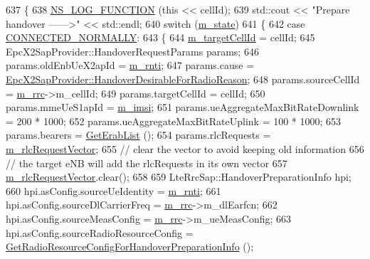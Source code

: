 \begin{DoxyCode}
637 \{
638   \hyperlink{log-macros-disabled_8h_a90b90d5bad1f39cb1b64923ea94c0761}{NS\_LOG\_FUNCTION} (\textcolor{keyword}{this} << cellId);
639   std::cout << \textcolor{stringliteral}{"Prepare handover ------>"} << std::endl;
640   \textcolor{keywordflow}{switch} (\hyperlink{classns3_1_1UeManager_aaed4b2490297cb912e743084f1a27b08}{m\_state})
641     \{
642     \textcolor{keywordflow}{case} \hyperlink{classns3_1_1UeManager_a2f4085fdd18d7125c27da44a5b8b6808a2a1020dce30f19aa9354ba34b2e7c5e0}{CONNECTED\_NORMALLY}:
643       \{
644         \hyperlink{classns3_1_1UeManager_a8a70641b8dfb0641e6cfcf4cc83083a3}{m\_targetCellId} = cellId;
645         EpcX2SapProvider::HandoverRequestParams params;
646         params.oldEnbUeX2apId = \hyperlink{classns3_1_1UeManager_a5a72b4fe818f21993bd7f05d7e2c4f83}{m\_rnti};
647         params.cause          = 
      \hyperlink{classns3_1_1EpcX2Sap_aecbbca5ab8e21ca831d8ad02dada6d85a967926119f5907b728250f8f7abe9a2e}{EpcX2SapProvider::HandoverDesirableForRadioReason};
648         params.sourceCellId   = \hyperlink{classns3_1_1UeManager_ab4405e9f354c66e7c1a4c95832290f5b}{m\_rrc}->m\_cellId;
649         params.targetCellId   = cellId;
650         params.mmeUeS1apId    = \hyperlink{classns3_1_1UeManager_a868dda076ecfc1d4202e357c16223d84}{m\_imsi};
651         params.ueAggregateMaxBitRateDownlink = 200 * 1000;
652         params.ueAggregateMaxBitRateUplink = 100 * 1000;
653         params.bearers = \hyperlink{classns3_1_1UeManager_aedc1779570a508b261381b0311811540}{GetErabList} ();
654         params.rlcRequests = \hyperlink{classns3_1_1UeManager_a998bc5ed29bd7edfa4c683adcfc7cabb}{m\_rlcRequestVector};
655         \textcolor{comment}{// clear the vector to avoid keeping old information}
656         \textcolor{comment}{// the target eNB will add the rlcRequests in its own vector}
657         \hyperlink{classns3_1_1UeManager_a998bc5ed29bd7edfa4c683adcfc7cabb}{m\_rlcRequestVector}.clear();
658 
659         LteRrcSap::HandoverPreparationInfo hpi;
660         hpi.asConfig.sourceUeIdentity = \hyperlink{classns3_1_1UeManager_a5a72b4fe818f21993bd7f05d7e2c4f83}{m\_rnti};
661         hpi.asConfig.sourceDlCarrierFreq = \hyperlink{classns3_1_1UeManager_ab4405e9f354c66e7c1a4c95832290f5b}{m\_rrc}->m\_dlEarfcn;
662         hpi.asConfig.sourceMeasConfig = \hyperlink{classns3_1_1UeManager_ab4405e9f354c66e7c1a4c95832290f5b}{m\_rrc}->m\_ueMeasConfig;
663         hpi.asConfig.sourceRadioResourceConfig = 
      \hyperlink{classns3_1_1UeManager_a310c374082bf0293d515592a15ecef4d}{GetRadioResourceConfigForHandoverPreparationInfo} ();

\end{DoxyCode}
